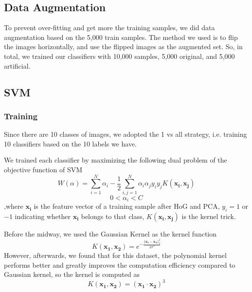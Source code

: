 \documentclass{article} %
\begin{document}
\subsection{Data Augmentation}
To prevent over-fitting and get more the training samples, we did data augmentation based on the 5,000 train samples. The method we used is to flip the images horizontally, and use the flipped images as the augmented set. So, in total, we trained our classifiers with 10,000 samples, 5,000 original, and 5,000 artificial.

\subsection{SVM}

\subsubsection{Training}

Since there are 10 classes of images, we adopted the 1 vs all strategy, i.e. training 10 classifiers based on the 10 labels we have.

We trained each classifier by maximizing the following dual problem of the objective function of SVM
\begin{equation}
W(\alpha)=\sum_{i=1}^{N}\alpha_{i}-\frac{1}{2}\sum_{i,j=1}^{N}\alpha_{i}\alpha_{j}y_{i}y_{j}K(\mathbf{x_{i}},\mathbf{x_{j}})
\end{equation}
\begin{equation}
0<\alpha_{i}<C
\end{equation}
,where $\mathbf{x_{i}}$ is the feature vector of a training sample after HoG and PCA, $y_{i}=1$ or $-1$ indicating whether $\mathbf{x_{i}}$ belongs to that class, $K(\mathbf{x_{i}},\mathbf{x_{j}})$ is the kernel trick.

Before the midway, we used the Gaussian Kernel as the kernel function
\begin{equation}
K(\mathbf{x_{1}},\mathbf{x_{2}})=e^{-\frac{||\mathbf{x_{1}}-\mathbf{x_{2}}||^{2}_{2}}{2\sigma^{2}}}
\end{equation}
However, afterwards, we found that for this dataset, the polynomial kernel performs better and greatly improves the computation efficiency compared to Gaussian kernel, so the kernel is computed as
\begin{equation}
K(\mathbf{x_{1}},\mathbf{x_{2}})=(\mathbf{x_{1}}\cdot\mathbf{x_{2}})^3
\end{equation}
\end{document}
